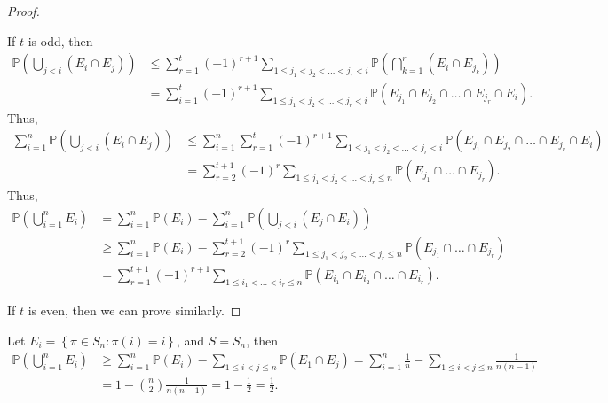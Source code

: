 \begin{proof}
\begin{itemize}
        If \(t\) is odd, then 
        \begin{align*}
            \mathbb{P} \left( \bigcup_{j < i} (E_i \cap E_j)  \right) &\le \sum_{r=1}^t (-1)^{r+1} \sum_{1 \le j_1 < j_2 < \dots < j_r < i} \mathbb{P} \left( \bigcap_{k=1}^{r} (E_{i} \cap E_{j_{k} })  \right) \\
            &= \sum_{i=1}^t (-1)^{r + 1} \sum_{1 \le j_1 < j_2 < \dots < j_r < i}\mathbb{P} (E_{j_1} \cap E_{j_2} \cap \dots \cap E_{j_r} \cap E_i).     
        \end{align*} 
        Thus, 
        \begin{align*}
            \sum_{i=1}^n \mathbb{P} \left( \bigcup_{j < i} (E_i \cap E_j)  \right) &\le \sum_{i=1}^n \sum_{r=1}^t (-1)^{r + 1} \sum_{1 \le j_1 < j_2 < \dots < j_r < i} \mathbb{P} \left( E_{j_1} \cap E_{j_2} \cap \dots \cap E_{j_r} \cap E_i \right) \\
            &= \sum_{r=2}^{t + 1} (-1)^r \sum_{1 \le j_1 < j_2 < \dots < j_r \le n} \mathbb{P} (E_{j_1} \cap \dots \cap E_{j_r}).        
        \end{align*}  
        Thus, 
        \begin{align*}
            \mathbb{P} \left( \bigcup_{i=1}^{n} E_i  \right) &= \sum_{i=1}^n \mathbb{P} (E_i) - \sum_{i=1}^n \mathbb{P} \left( \bigcup_{j < i} (E_j \cap E_i)  \right) \\
            &\ge \sum_{i=1}^n \mathbb{P} (E_i) - \sum_{r=2}^{t + 1} (-1)^r \sum_{1 \le j_1 < j_2 < \dots < j_r \le n} \mathbb{P} (E_{j_1} \cap \dots \cap E_{j_r}) \\
            &= \sum_{r=1}^{t+1} (-1)^{r + 1} \sum_{1 \le i_1 < \dots < i_r \le n} \mathbb{P} (E_{i_1} \cap E_{i_2} \cap \dots \cap E_{i_r}).         
        \end{align*}
    \end{itemize} 

    If \(t\) is even, then we can prove similarly. 
\end{proof}

\begin{eg}
    Let \(E_i = \left\{ \pi \in S_n : \pi (i) = i \right\} \), and \(S = S_n\), then 
    \begin{align*}
        \mathbb{P} \left( \bigcup_{i=1}^{n} E_i  \right) &\ge \sum_{i=1}^n \mathbb{P} (E_i) - \sum_{1 \le i < j \le n} \mathbb{P} (E_1 \cap E_j) = \sum_{i=1}^n \frac{1}{n} - \sum_{1 \le i < j \le n}\frac{1}{n(n-1)} \\
        &= 1 - \binom{n}{2} \frac{1}{n(n-1)} = 1 - \frac{1}{2} = \frac{1}{2}.     
    \end{align*} 
\end{eg}

